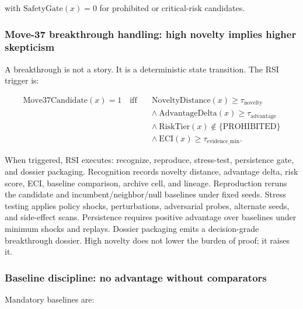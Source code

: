 with \(\mathrm{SafetyGate}(x)=0\) for prohibited or critical-risk
candidates.

\subsubsection{Move-37 breakthrough handling: high novelty implies
higher
skepticism}\label{move-37-breakthrough-handling-high-novelty-implies-higher-skepticism}

A breakthrough is not a story. It is a deterministic state transition.
The RSI trigger is:

\[
\begin{aligned}
\mathrm{Move37Candidate}(x)=1
\quad\mathrm{iff}\quad&
\mathrm{NoveltyDistance}(x)\geq\tau_{\mathrm{novelty}}\\
&\wedge\ \mathrm{AdvantageDelta}(x)\geq\tau_{\mathrm{advantage}}\\
&\wedge\ \mathrm{RiskTier}(x)\notin\{\mathrm{PROHIBITED}\}\\
&\wedge\ \mathrm{ECI}(x)\geq\tau_{\mathrm{evidence\_min}} .
\end{aligned}
\]

When triggered, RSI executes: recognize, reproduce, stress-test,
persistence gate, and dossier packaging. Recognition records novelty
distance, advantage delta, risk score, ECI, baseline comparison, archive
cell, and lineage. Reproduction reruns the candidate and
incumbent/neighbor/null baselines under fixed seeds. Stress testing
applies policy shocks, perturbations, adversarial probes, alternate
seeds, and side-effect scans. Persistence requires positive advantage
over baselines under minimum shocks and replays. Dossier packaging emits
a decision-grade breakthrough dossier. High novelty does not lower the
burden of proof; it raises it.

\subsubsection{Baseline discipline: no advantage without
comparators}\label{baseline-discipline-no-advantage-without-comparators}

Mandatory baselines are:

